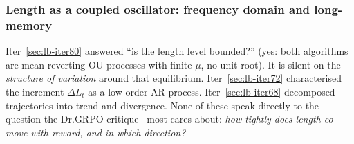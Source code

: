 
\subsubsection{Length as a coupled oscillator: frequency domain and long-memory}\label{sec:lb-iter84}

Iter~\ref{sec:lb-iter80} answered ``is the length level bounded?'' (yes: both
algorithms are mean-reverting OU processes with finite $\mu$, no unit root).
It is silent on the \emph{structure of variation} around that equilibrium.
Iter~\ref{sec:lb-iter72} characterised the increment $\Delta L_t$ as a
low-order AR process. Iter~\ref{sec:lb-iter68} decomposed trajectories into
trend and divergence. None of these speak directly to the question the
Dr.GRPO critique~\citep{tong2025drgrpo} most cares about: \emph{how tightly
does length co-move with reward, and in which direction?}

